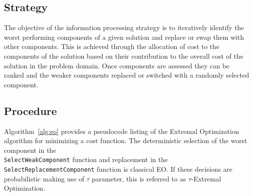 \subsection{Strategy}
The objective of the information processing strategy is to iteratively identify the worst performing components of a given solution and replace or swap them with other components.
This is achieved through the allocation of cost to the components of the solution based on their contribution to the overall cost of the solution in the problem domain. Once components are assessed they can be ranked and the weaker components replaced or switched with a randomly selected component.

\subsection{Procedure}
Algorithm~\ref{alg:eo} provides a pseudocode listing of the Extremal Optimization algorithm for minimizing a cost function. The deterministic selection of the worst component in the \\ \texttt{Select\-Weak\-Component} function and replacement in the \texttt{Select\-Replacement\-Component} function is classical EO. If these decisions are probabilistic making use of $\tau$ parameter, this is referred to as $\tau$-Extremal Optimization.

